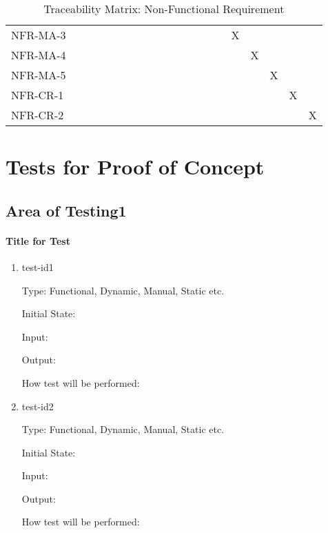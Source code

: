 \documentclass[12pt, titlepage]{article}
\begin{document}
\begin{table}[h!]
{\begin{tabular}{lccccccccccccccccccc}
\multicolumn{1}{l|}{NFR-MA-3} &  &  &  &  &  &  &  &  &  &  &  &  &  &  & X &  &  &  &  \\
\multicolumn{1}{l|}{NFR-MA-4} &  &  &  &  &  &  &  &  &  &  &  &  &  &  &  & X &  &  &  \\
\multicolumn{1}{l|}{NFR-MA-5} &  &  &  &  &  &  &  &  &  &  &  &  &  &  &  &  & X &  &  \\
\multicolumn{1}{l|}{NFR-CR-1} &  &  &  &  &  &  &  &  &  &  &  &  &  &  &  &  &  & X &  \\
\multicolumn{1}{l|}{NFR-CR-2} &  &  &  &  &  &  &  &  &  &  &  &  &  &  &  &  &  &  & X
\end{tabular}
}
\caption{Traceability Matrix: Non-Functional Requirement}
\label{Traceability Matrix: Non-Functional Requirement}
\end{table}

\normalsize

\section{Tests for Proof of Concept}

\subsection{Area of Testing1}
		
\paragraph{Title for Test}

\begin{enumerate}

\item{test-id1\\}

Type: Functional, Dynamic, Manual, Static etc.
					
Initial State: 
					
Input: 
					
Output: 
					
How test will be performed: 
					
\item{test-id2\\}

Type: Functional, Dynamic, Manual, Static etc.
					
Initial State: 
					
Input: 
					
Output: 
					
How test will be performed: 

\end{enumerate}
\end{document}
